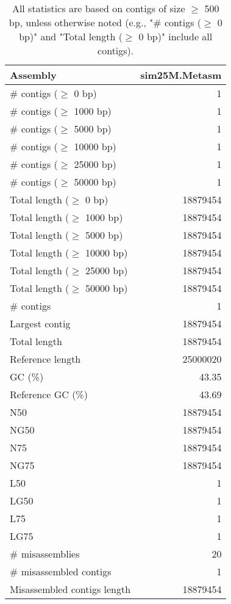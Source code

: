 \documentclass[12pt,a4paper]{article}
\begin{document}
\begin{table}[ht]
\begin{center}
\caption{All statistics are based on contigs of size $\geq$ 500 bp, unless otherwise noted (e.g., "\# contigs ($\geq$ 0 bp)" and "Total length ($\geq$ 0 bp)" include all contigs).}
\begin{tabular}{|l*{1}{|r}|}
\hline
Assembly & sim25M.Metasm \\ \hline
\# contigs ($\geq$ 0 bp) & 1 \\ \hline
\# contigs ($\geq$ 1000 bp) & 1 \\ \hline
\# contigs ($\geq$ 5000 bp) & 1 \\ \hline
\# contigs ($\geq$ 10000 bp) & 1 \\ \hline
\# contigs ($\geq$ 25000 bp) & 1 \\ \hline
\# contigs ($\geq$ 50000 bp) & 1 \\ \hline
Total length ($\geq$ 0 bp) & 18879454 \\ \hline
Total length ($\geq$ 1000 bp) & 18879454 \\ \hline
Total length ($\geq$ 5000 bp) & 18879454 \\ \hline
Total length ($\geq$ 10000 bp) & 18879454 \\ \hline
Total length ($\geq$ 25000 bp) & 18879454 \\ \hline
Total length ($\geq$ 50000 bp) & 18879454 \\ \hline
\# contigs & 1 \\ \hline
Largest contig & 18879454 \\ \hline
Total length & 18879454 \\ \hline
Reference length & 25000020 \\ \hline
GC (\%) & 43.35 \\ \hline
Reference GC (\%) & 43.69 \\ \hline
N50 & 18879454 \\ \hline
NG50 & 18879454 \\ \hline
N75 & 18879454 \\ \hline
NG75 & 18879454 \\ \hline
L50 & 1 \\ \hline
LG50 & 1 \\ \hline
L75 & 1 \\ \hline
LG75 & 1 \\ \hline
\# misassemblies & 20 \\ \hline
\# misassembled contigs & 1 \\ \hline
Misassembled contigs length & 18879454 \\ \hline

\end{tabular}
\end{center}
\end{table}
\end{document}
